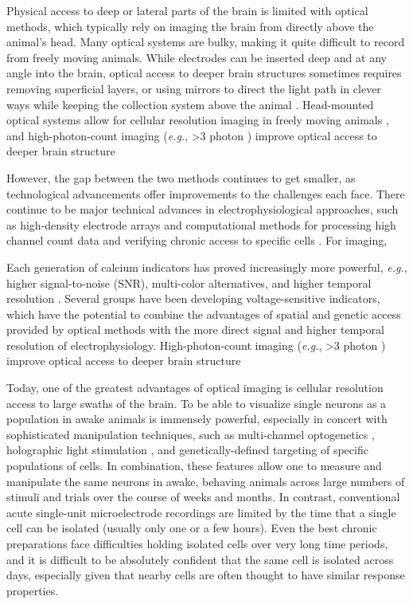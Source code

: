 Physical access to deep or lateral parts of the brain is limited with optical methods, which typically rely on imaging the brain from directly above the animal's head. Many optical systems are bulky, making it quite difficult to record from freely moving animals. While electrodes can be inserted deep and at any angle into the brain, optical access to deeper brain structures sometimes requires removing superficial layers\cite{REFREF}, or using mirrors to direct the light path in clever ways while keeping the collection system above the animal \cite{REFREF prism}. Head-mounted optical systems allow for cellular resolution imaging in freely moving animals \cite{REFREF miniscope, Helmchen2001, Sawinski2009}, and high-photon-count imaging (\textit{e.g.}, >3 photon \cite{REFREF}) improve optical access to deeper brain structure

However, the gap between the two methods continues to get smaller, as technological advancements offer improvements to the challenges each face. There continue to be major technical advances in electrophysiological approaches, such as high-density electrode arrays \cite{REFREF} and computational methods for processing high channel count data and verifying chronic access to specific cells \cite{REFREF}. For imaging, 

Each generation of calcium indicators has proved increasingly more powerful, \textit{e.g.}, higher signal-to-noise (SNR), multi-color alternatives, and higher temporal resolution \cite{Akerboom2012OptimizationImaging, Chen2013UltrasensitiveActivity, REFREF}. Several groups \cite{REFREF, Adam Cohen, etc} have been developing voltage-sensitive indicators, which have the potential to combine the advantages of spatial and genetic access provided by optical methods with the more direct signal and higher temporal resolution of electrophysiology. High-photon-count imaging (\textit{e.g.}, >3 photon \cite{REFREF}) improve optical access to deeper brain structure

Today, one of the greatest advantages of optical imaging is cellular resolution access to large swaths of the brain. To be able to visualize single neurons as a population in awake animals is immensely powerful, especially in concert with sophisticated manipulation techniques, such as multi-channel optogenetics \cite{REFREF}, holographic light stimulation \cite{REFREF}, and genetically-defined targeting of specific populations of cells. In combination, these features allow one to measure and manipulate the same neurons in awake, behaving animals across large numbers of stimuli and trials over the course of weeks and months. In contrast, conventional acute single-unit microelectrode recordings are limited by the time that a single cell can be isolated (usually only one or a few hours). Even the best chronic preparations face difficulties holding isolated cells over very long time periods, and it is difficult to be absolutely confident that the same cell is isolated across days, especially given that nearby cells are often thought to have similar response properties.

